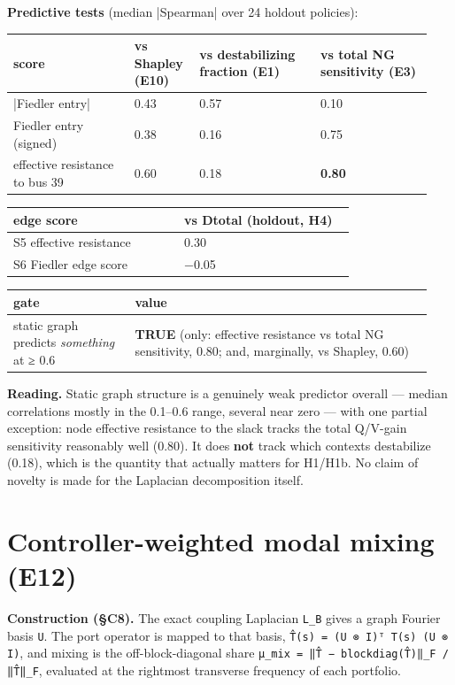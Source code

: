\documentclass[10pt,a4paper]{article}
\begin{document}
\textbf{Predictive tests} (median |Spearman| over 24 holdout policies):

{\small
\begin{longtable}{L{0.271\linewidth}L{0.145\linewidth}L{0.271\linewidth}L{0.253\linewidth}}
\toprule
\textbf{score} & \textbf{vs Shapley (E10)} & \textbf{vs destabilizing fraction (E1)} & \textbf{vs total NG sensitivity (E3)} \\
\midrule
\endhead
|Fiedler entry| & 0.43 & 0.57 & 0.10 \\
Fiedler entry (signed) & 0.38 & 0.16 & 0.75 \\
effective resistance to bus 39 & 0.60 & 0.18 & \textbf{0.80} \\
\bottomrule
\end{longtable}}
{\small
\begin{longtable}{L{0.470\linewidth}L{0.470\linewidth}}
\toprule
\textbf{edge score} & \textbf{vs Dtotal (holdout, H4)} \\
\midrule
\endhead
S5 effective resistance & 0.30 \\
S6 Fiedler edge score & −0.05 \\
\bottomrule
\end{longtable}}
{\small
\begin{longtable}{L{0.274\linewidth}L{0.666\linewidth}}
\toprule
\textbf{gate} & \textbf{value} \\
\midrule
\endhead
static graph predicts \emph{something} at ≥ 0.6 & \textbf{TRUE} (only: effective resistance vs total NG sensitivity, 0.80; and, marginally, vs Shapley, 0.60) \\
\bottomrule
\end{longtable}}
\textbf{Reading.} Static graph structure is a genuinely weak predictor overall — median correlations mostly in the 0.1–0.6 range, several near zero — with one partial exception: node effective resistance to the slack tracks the total Q/V-gain sensitivity reasonably well (0.80). It does \textbf{not} track which contexts destabilize (0.18), which is the quantity that actually matters for H1/H1b. No claim of novelty is made for the Laplacian decomposition itself.

\section{Controller-weighted modal mixing (E12)}
\textbf{Construction (§C8).} The exact coupling Laplacian \texttt{L\_\allowbreak{}B} gives a graph Fourier basis \texttt{U}. The port operator is mapped to that basis, \texttt{T̂(s) =\allowbreak{} (U ⊗ I)ᵀ T(s) (U ⊗ I)}, and mixing is the off-block-diagonal share \texttt{μ\_\allowbreak{}mix =\allowbreak{} ‖T̂ − blockdiag(T̂)‖\_\allowbreak{}F /\allowbreak{} ‖T̂‖\_\allowbreak{}F}, evaluated at the rightmost transverse frequency of each portfolio.
\end{document}
